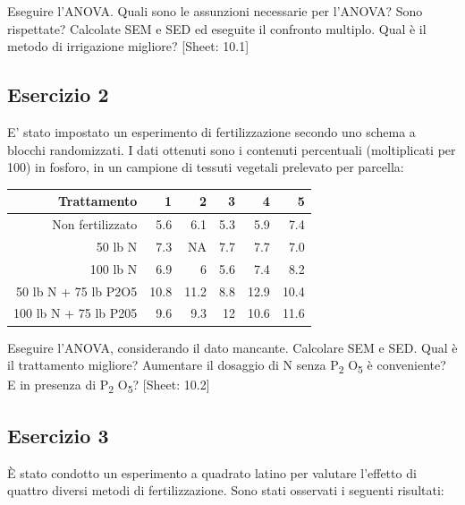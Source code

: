 \documentclass[a4paper,12pt,oneside]{book}
\begin{document}
Eseguire l'ANOVA. Quali sono le assunzioni necessarie per l'ANOVA? Sono rispettate? Calcolate SEM e SED ed eseguite il confronto multiplo. Qual è il metodo di irrigazione migliore?
{[}Sheet: 10.1{]}

\hypertarget{esercizio-2-6}{%
\subsection{Esercizio 2}\label{esercizio-2-6}}

E' stato impostato un esperimento di fertilizzazione secondo uno schema a blocchi randomizzati. I dati ottenuti sono i contenuti percentuali (moltiplicati per 100) in fosforo, in un campione di tessuti vegetali prelevato per parcella:

\begin{longtable}[]{@{}rrrrrr@{}}
\toprule()
Trattamento & 1 & 2 & 3 & 4 & 5 \\
\midrule()
\endhead
Non fertilizzato & 5.6 & 6.1 & 5.3 & 5.9 & 7.4 \\
50 lb N & 7.3 & NA & 7.7 & 7.7 & 7.0 \\
100 lb N & 6.9 & 6 & 5.6 & 7.4 & 8.2 \\
50 lb N + 75 lb P2O5 & 10.8 & 11.2 & 8.8 & 12.9 & 10.4 \\
100 lb N + 75 lb P205 & 9.6 & 9.3 & 12 & 10.6 & 11.6 \\
\bottomrule()
\end{longtable}

Eseguire l'ANOVA, considerando il dato mancante. Calcolare SEM e SED. Qual è il trattamento migliore? Aumentare il dosaggio di N senza P\textsubscript{2} O\textsubscript{5} è conveniente? E in presenza di P\textsubscript{2} O\textsubscript{5}?
{[}Sheet: 10.2{]}

\hypertarget{esercizio-3-6}{%
\subsection{Esercizio 3}\label{esercizio-3-6}}

È stato condotto un esperimento a quadrato latino per valutare l'effetto di quattro diversi metodi di fertilizzazione. Sono stati osservati i seguenti risultati:
\end{document}
